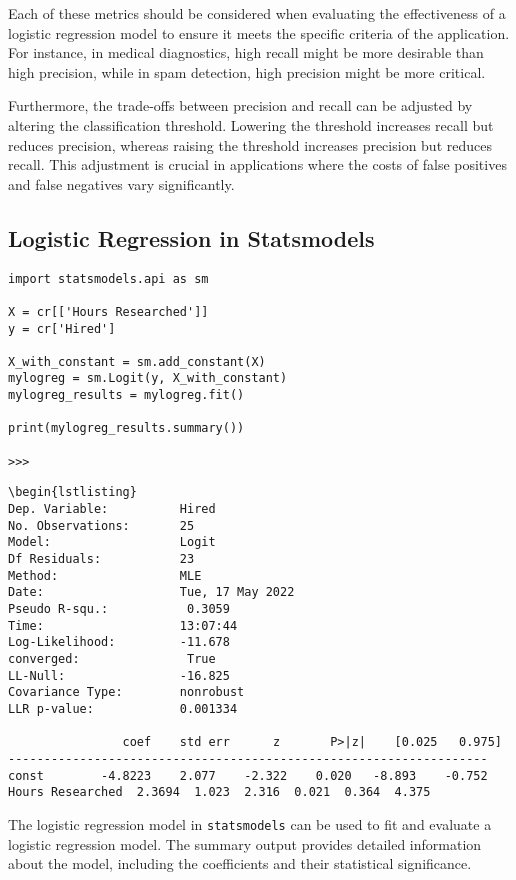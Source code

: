 \documentclass{article}
\theoremstyle{definition}
\theoremstyle{theorem}
\theoremstyle{theorem}
\theoremstyle{theorem}
\theoremstyle{theorem}
\theoremstyle{definition}
\theoremstyle{definition}
\theoremstyle{definition}
\theoremstyle{definition}
\theoremstyle{definition}
\begin{document}
Each of these metrics should be considered when evaluating the effectiveness of a logistic regression model to ensure it meets the specific criteria of the application. For instance, in medical diagnostics, high recall might be more desirable than high precision, while in spam detection, high precision might be more critical.

Furthermore, the trade-offs between precision and recall can be adjusted by altering the classification threshold. Lowering the threshold increases recall but reduces precision, whereas raising the threshold increases precision but reduces recall. This adjustment is crucial in applications where the costs of false positives and false negatives vary significantly.




\subsection{Logistic Regression in Statsmodels}

\begin{verbatim}
import statsmodels.api as sm

X = cr[['Hours Researched']]
y = cr['Hired']

X_with_constant = sm.add_constant(X)
mylogreg = sm.Logit(y, X_with_constant)
mylogreg_results = mylogreg.fit()

print(mylogreg_results.summary())

>>>

\end{verbatim}
\begin{lstlisting}
\begin{lstlisting}
Dep. Variable:          Hired
No. Observations:       25
Model:                  Logit
Df Residuals:           23
Method:                 MLE
Date:                   Tue, 17 May 2022
Pseudo R-squ.:           0.3059
Time:                   13:07:44
Log-Likelihood:         -11.678
converged:               True
LL-Null:                -16.825
Covariance Type:        nonrobust
LLR p-value:            0.001334

                coef    std err      z       P>|z|    [0.025   0.975]
-------------------------------------------------------------------
const        -4.8223    2.077    -2.322    0.020   -8.893    -0.752
Hours Researched  2.3694  1.023  2.316  0.021  0.364  4.375
\end{lstlisting}

The logistic regression model in \texttt{statsmodels} can be used to fit and evaluate a logistic regression model. The summary output provides detailed information about the model, including the coefficients and their statistical significance.
\end{document}
